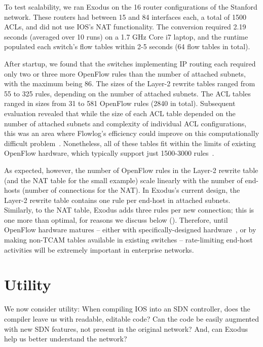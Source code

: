 To test scalability, we ran Exodus on the 16 router configurations of the Stanford
network.
%
These routers had between 15 and 84 interfaces each, a total of 1500 ACLs, and did
not use IOS's NAT functionality. The conversion required 2.19 seconds (averaged over
10 runs) on a 1.7 GHz Core i7 laptop, and the runtime
populated each switch's flow tables within 2-5 seconds (64 flow tables in total).

After startup, we found that the switches implementing IP routing each required only two or three more
OpenFlow rules than the number of attached subnets, with the maximum being 86.
The sizes of the Layer-2 rewrite tables ranged from 55 to 325 rules, depending on the
number of attached subnets.
The ACL tables ranged in sizes from 31 to 581 OpenFlow rules (2840 in total).
Subsequent evaluation revealed that while the size of each ACL table depended on the
number of attached subnets and complexity of individual ACL configurations, this
was an area where Flowlog's efficiency could improve on this computationally difficult
problem~\cite{Applegate:2007compressing}.
Nonetheless, all of these tables fit within the limits of existing
OpenFlow hardware, which typically support just 1500-3000 rules~\cite{Rotsos:2012oflops}.

As expected, however, the number of OpenFlow rules in the Layer-2 rewrite table
(and the NAT table for the small example) scale linearly with the number of end-hosts
(number of connections for the NAT). In Exodus's current design, the Layer-2 rewrite
table contains one rule per end-host in attached subnets.
Similarly, to the NAT table, Exodus adds three rules per new connection; this is one
more than optimal, for reasons we discuss below ().
Therefore, until OpenFlow hardware matures -- either with specifically-designed hardware~\cite{Bosshart:2013ppipp-arxiv},
or by making non-TCAM tables available in existing switches -- rate-limiting end-host activities will
be extremely important in enterprise networks.

\section{Utility}
\label{sec:utility}

We now consider utility: When compiling IOS into an SDN
controller, does the compiler leave us with readable, editable code?
Can the code be easily augmented with new SDN features, not present in the
original network? And, can Exodus help us better understand the network?

